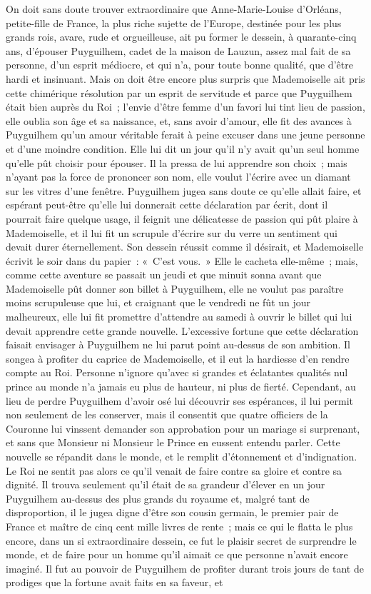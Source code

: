 \documentclass[french,twoside]{book} %
\begin{document}
On doit sans doute trouver extraordinaire que Anne-Marie-Louise d’Orléans, petite-fille de France, la plus riche sujette de l’Europe, destinée pour les plus grands rois, avare, rude et orgueilleuse, ait pu former le dessein, à quarante-cinq ans, d’épouser Puyguilhem, cadet de la maison de Lauzun, assez mal fait de sa personne, d’un esprit médiocre, et qui n’a, pour toute bonne qualité, que d’être hardi et insinuant. Mais on doit être encore plus surpris que Mademoiselle ait pris cette chimérique résolution par un esprit de servitude et parce que Puyguilhem était bien auprès du Roi ; l’envie d’être femme d’un favori lui tint lieu de passion, elle oublia son âge et sa naissance, et, sans avoir d’amour, elle fit des avances à Puyguilhem qu’un amour véritable ferait à peine excuser dans une jeune personne et d’une moindre condition. Elle lui dit un jour qu’il n’y avait qu’un seul homme qu’elle pût choisir pour épouser. Il la pressa de lui apprendre son choix ; mais n’ayant pas la force de prononcer son nom, elle voulut l’écrire avec un diamant sur les vitres d’une fenêtre. Puyguilhem jugea sans doute ce qu’elle allait faire, et espérant peut-être qu’elle lui donnerait cette déclaration par écrit, dont il pourrait faire quelque usage, il feignit une délicatesse de passion qui pût plaire à Mademoiselle, et il lui fit un scrupule d’écrire sur du verre un sentiment qui devait durer éternellement. Son dessein réussit comme il désirait, et Mademoiselle écrivit le soir dans du papier : « C’est vous. » Elle le cacheta elle-même ; mais, comme cette aventure se passait un jeudi et que minuit sonna avant que Mademoiselle pût donner son billet à Puyguilhem, elle ne voulut pas paraître moins scrupuleuse que lui, et craignant que le vendredi ne fût un jour malheureux, elle lui fit promettre d’attendre au samedi à ouvrir le billet qui lui devait apprendre cette grande nouvelle. L’excessive fortune que cette déclaration faisait envisager à Puyguilhem ne lui parut point au-dessus de son ambition. Il songea à profiter du caprice de Mademoiselle, et il eut la hardiesse d’en rendre compte au Roi. Personne n’ignore qu’avec si grandes et éclatantes qualités nul prince au monde n’a jamais eu plus de hauteur, ni plus de fierté. Cependant, au lieu de perdre Puyguilhem d’avoir osé lui découvrir ses espérances, il lui permit non seulement de les conserver, mais il consentit que quatre officiers de la Couronne lui vinssent demander son approbation pour un mariage si surprenant, et sans que Monsieur ni Monsieur le Prince en eussent entendu parler. Cette nouvelle se répandit dans le monde, et le remplit d’étonnement et d’indignation. Le Roi ne sentit pas alors ce qu’il venait de faire contre sa gloire et contre sa dignité. Il trouva seulement qu’il était de sa grandeur d’élever en un jour Puyguilhem au-dessus des plus grands du royaume et, malgré tant de disproportion, il le jugea digne d’être son cousin germain, le premier pair de France et maître de cinq cent mille livres de rente ; mais ce qui le flatta le plus encore, dans un si extraordinaire dessein, ce fut le plaisir secret de surprendre le monde, et de faire pour un homme qu’il aimait ce que personne n’avait encore imaginé. Il fut au pouvoir de Puyguilhem de profiter durant trois jours de tant de prodiges que la fortune avait faits en sa faveur, et 
\end{document}
